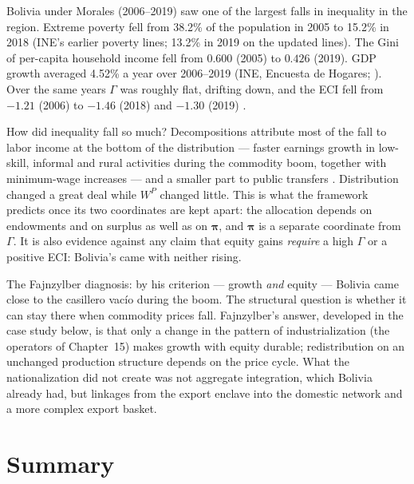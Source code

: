\documentclass[../structural_economics_book.tex]{subfiles}
\begin{document}
\begin{prebisch}
Bolivia under Morales (2006--2019) saw one of the largest falls in inequality in the region. Extreme poverty fell from 38.2\% of the population in 2005 to 15.2\% in 2018 (INE's earlier poverty lines; 13.2\% in 2019 on the updated lines). The Gini of per-capita household income fell from $0.600$ (2005) to $0.426$ (2019). GDP growth averaged 4.52\% a year over 2006--2019 (INE, Encuesta de Hogares; \citealp{worldbank2026wdi}). Over the same years $\Gamma$ was roughly flat, drifting down, and the ECI fell from $-1.21$ (2006) to $-1.46$ (2018) and $-1.30$ (2019) \citep{growthlab2026atlas}.

How did inequality fall so much? Decompositions attribute most of the fall to labor income at the bottom of the distribution --- faster earnings growth in low-skill, informal and rural activities during the commodity boom, together with minimum-wage increases --- and a smaller part to public transfers \citep{vargas2015explaining}. Distribution changed a great deal while $W^P$ changed little. This is what the framework predicts once its two coordinates are kept apart: the allocation depends on endowments and on surplus as well as on $\boldsymbol{\pi}$, and $\boldsymbol{\pi}$ is a separate coordinate from $\Gamma$. It is also evidence against any claim that equity gains \emph{require} a high $\Gamma$ or a positive ECI: Bolivia's came with neither rising.

The Fajnzylber diagnosis: by his criterion --- growth \emph{and} equity --- Bolivia came close to the casillero vac\'{i}o during the boom. The structural question is whether it can stay there when commodity prices fall. Fajnzylber's answer, developed in the case study below, is that only a change in the pattern of industrialization (the operators of Chapter~15) makes growth with equity durable; redistribution on an unchanged production structure depends on the price cycle. What the nationalization did not create was not aggregate integration, which Bolivia already had, but linkages from the export enclave into the domestic network and a more complex export basket.
\end{prebisch}


\section{Summary}
\label{ch17:sec:summary}
\end{document}
